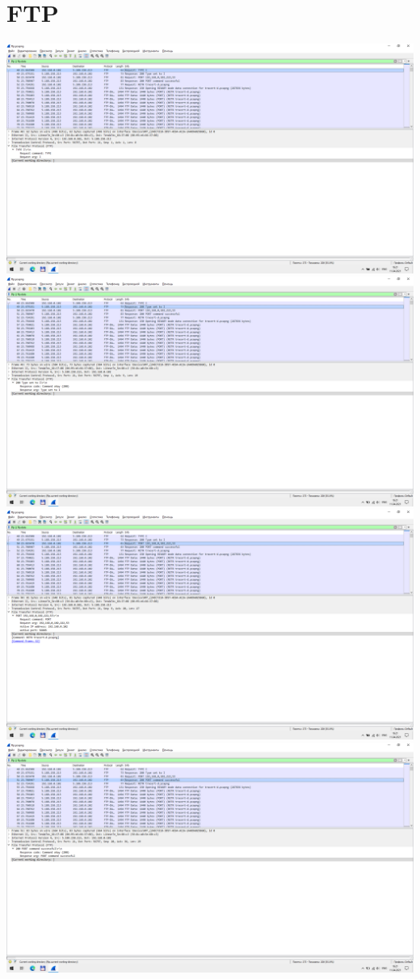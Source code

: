 \section{FTP}
\includegraphics{screenshots/ftp_type_I_request_1}
\includegraphics{screenshots/ftp_type_I_response_1}
\includegraphics{screenshots/ftp_port_request_1}
\includegraphics{screenshots/ftp_port_response_1}

